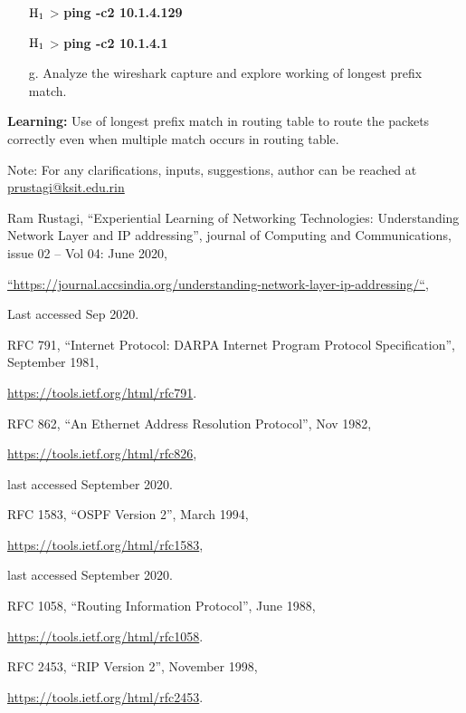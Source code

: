\begin{multicols}{2}
\begin{itemize}
${\rm H}_{1}$ > \textbf{ping -c2 10.1.4.129}

${\rm H}_{1}$ > \textbf{ping -c2 10.1.4.1}

\item[g.] Analyze the wireshark capture and explore working of longest prefix match.
\end{itemize}

\textbf{Learning:} Use of longest prefix match in routing table to route the packets correctly even when multiple match occurs in routing table.

Note: For any clarifications, inputs, suggestions, author can be reached at \url{prustagi@ksit.edu.rin} 

\begin{thebibliography}{99}

 Ram Rustagi, “Experiential Learning of Networking Technologies: Understanding Network Layer and IP addressing”, journal of Computing and Communications, issue 02 – Vol 04: June 2020,

\url{“https://journal.accsindia.org/understanding-network-layer-ip-addressing/“},

Last accessed Sep 2020.

 RFC 791, “Internet Protocol: DARPA Internet Program Protocol Specification”, September 1981,

\url{ https://tools.ietf.org/html/rfc791}.

 RFC 862, “An Ethernet Address Resolution Protocol”, Nov 1982, 

\url{https://tools.ietf.org/html/rfc826},

last accessed September 2020.

 RFC 1583, “OSPF Version 2”, March 1994,

\url{ https://tools.ietf.org/html/rfc1583},

last accessed September 2020.

 RFC 1058, “Routing Information Protocol”, June 1988,

\url{https://tools.ietf.org/html/rfc1058}.

 RFC 2453, “RIP Version 2”, November 1998, 

\url{https://tools.ietf.org/html/rfc2453}.


\end{thebibliography}
\end{multicols}

